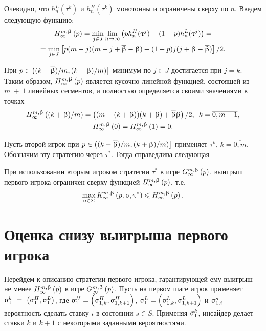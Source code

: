 Очевидно, что $h_n^L(\tau^k)$ и $h_n^H(\tau^k)$ монотонны и ограничены сверху по
$n$. Введем следующую функцию:
\begin{multline*}
  \upperBound{p} = \min_{j \in J} \lim_{n \rightarrow \infty}\left(
    ph_n^H(\tau^j) + (1-p)h_n^L(\tau^j)
  \right) = \\
  = \min_{j \in J} \left[ p (m - j)(m - j + \DCo - \Co) + (1 - p)j(j + \Co
    - \DCo) \right] / 2.
\end{multline*}

При $p \in \left( (k-\DCo)/m, (k+\Co)/m) \right]$ минимум по $j \in J$
достигается при $j = k$. Таким образом, $\upperBound{p}$ является
кусочно-линейной функцией, состоящей из $m~+~1$ линейных сегментов, и полностью
определяется своими значениями в точках
\begin{gather*}
  \upperBound{(k+\Co)/m} = \left( (m - (k + \Co))(k + \Co) + \DCo\Co
  \right) / 2, \enskip
  k = \overline{0, m - 1},\\
  \upperBound{0} = \upperBound{1} = 0.
\end{gather*}

Пусть второй игрок при $p \in \left( (k-\DCo)/m, (k+\Co)/m) \right]$
применяет $\tau^k, \, k = \overline{0, m}$. Обозначим эту стратегию через
$\tau^*$. Тогда справедлива следующая

\begin{lemma}
  \label{lemma:upperBound}
  При использовании вторым игроком стратегии $\tau^*$ в игре
  $\infiniteGame{p}$\textup{,} выигрыш первого игрока ограничен сверху функцией
  $\upperBound{p}$, т.е.
  \[
    \max_{\sigma \in \Sigma} \infiniteFirstPlayerPayoff{p}{\sigma}{\tau^*} \leq
    \upperBound{p}.
  \]
\end{lemma}

\section{Оценка снизу выигрыша первого игрока}
Перейдем к описанию стратегии первого игрока, гарантирующей ему выигрыш не менее
$\upperBound{p}$ в игре $\infiniteGame{p}$. Пусть на первом шаге игрок применяет
$ \fGeneral{k}~=~\left(\fGeneral{H}, \fGeneral{L}\right) $, где $\fGeneral{H} =
\left(\fGeneral[1,k]{H}, \fGeneral[1,k+1]{H}\right)$, $\fGeneral{L} =
\left(\fGeneral[1,k]{L}, \fGeneral[1,k+1]{L}\right)$ и $\fGeneral[1,i]{s}$ --
вероятность сделать ставку $i$ в состоянии $s \in S$. Применяя
$\fGeneral{k}$, инсайдер делает ставки $k$ и $k+1$ с некоторыми заданными
вероятностями.

